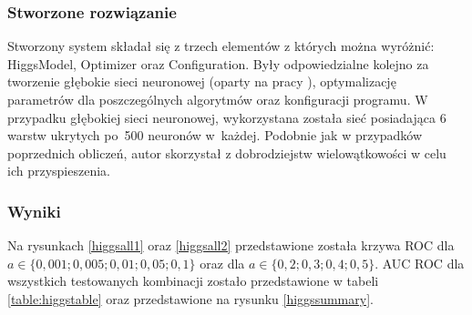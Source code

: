 \subsubsection{Stworzone rozwiązanie}
Stworzony system składał się z trzech elementów z których można wyróżnić: HiggsModel, Optimizer oraz Configuration. Były odpowiedzialne kolejno za tworzenie głębokie sieci neuronowej (oparty na pracy \cite{higgs2}), optymalizację parametrów dla poszczególnych algorytmów oraz konfiguracji programu. W przypadku głębokiej sieci neuronowej, wykorzystana została sieć posiadająca 6 warstw ukrytych po~500 neuronów w~każdej. Podobnie jak w przypadków poprzednich obliczeń, autor skorzystał z dobrodziejstw wielowątkowości w celu ich przyspieszenia.


\subsubsection{Wyniki}
Na rysunkach \ref{higgsall1} oraz \ref{higgsall2} przedstawione została krzywa ROC dla $a\in\{0,001; 0,005; 0,01; 0,05; 0,1\}$  oraz dla $a\in\{0,2; 0,3; 0,4; 0,5\}$. AUC ROC dla wszystkich testowanych kombinacji zostało przedstawione w tabeli \ref{table:higgstable} oraz przedstawione na rysunku \ref{higgssummary}.


